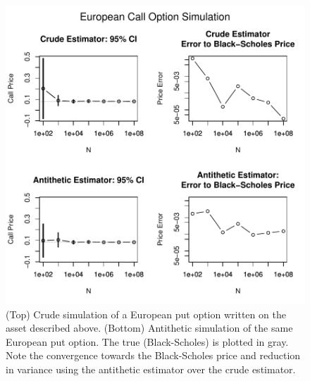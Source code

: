\documentclass[12pt]{article}
\begin{document}
\begin{figure}[H]
	\centering
 	\includegraphics[scale=1]{../plots/q1/call_lognormal_sim_est.pdf}
\caption{(Top) Crude simulation of a European put option written on the asset described above. (Bottom) Antithetic simulation of the same European put option. The true (Black-Scholes) is plotted in gray. Note the convergence towards the Black-Scholes price and reduction in variance using the antithetic estimator over the crude estimator.}
\label{fig:call_lognormal_sim}
\end{figure}
\end{document}
